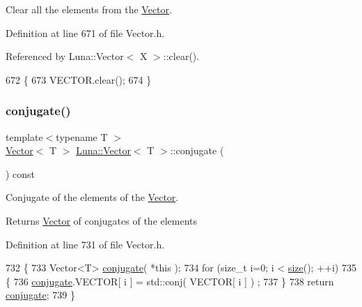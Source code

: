 Clear all the elements from the \hyperlink{classLuna_1_1Vector}{Vector}. 



Definition at line 671 of file Vector.\+h.



Referenced by Luna\+::\+Vector$<$ X $>$\+::clear().


\begin{DoxyCode}
672   \{
673     VECTOR.clear();
674   \}
\end{DoxyCode}
\mbox{\label{classLuna_1_1Vector_a17316bfedb7386a960206e0b0f22ecb4}} 
\subsubsection{\texorpdfstring{conjugate()}{conjugate()}}
{\footnotesize\ttfamily template$<$typename T $>$ \\
\hyperlink{classLuna_1_1Vector}{Vector}$<$ T $>$ \hyperlink{classLuna_1_1Vector}{Luna\+::\+Vector}$<$ T $>$\+::conjugate (\begin{DoxyParamCaption}{ }\end{DoxyParamCaption}) const\hspace{0.3cm}{\ttfamily [inline]}}



Conjugate of the elements of the \hyperlink{classLuna_1_1Vector}{Vector}. 

\begin{DoxyReturn}{Returns}
\hyperlink{classLuna_1_1Vector}{Vector} of conjugates of the elements 
\end{DoxyReturn}


Definition at line 731 of file Vector.\+h.


\begin{DoxyCode}
732   \{
733      Vector<T> \hyperlink{classLuna_1_1Vector_a17316bfedb7386a960206e0b0f22ecb4}{conjugate}( *\textcolor{keyword}{this} );
734      \textcolor{keywordflow}{for} (\textcolor{keywordtype}{size\_t} i=0; i < \hyperlink{classLuna_1_1Vector_ac9b6ed7a0df401728f27c193fbc8f4d8}{size}(); ++i)
735      \{
736        \hyperlink{classLuna_1_1Vector_a17316bfedb7386a960206e0b0f22ecb4}{conjugate}.VECTOR[ i ] = std::conj( VECTOR[ i ] ) ;
737      \}
738      \textcolor{keywordflow}{return} \hyperlink{classLuna_1_1Vector_a17316bfedb7386a960206e0b0f22ecb4}{conjugate};
739   \}
\end{DoxyCode}
\mbox{\label{classLuna_1_1Vector_a0c54499efcc61b644a88f59a07b68105}} 
